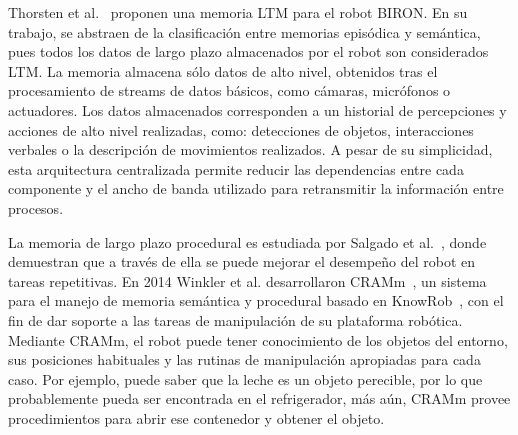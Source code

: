 Thorsten et al.~\cite{Spexard2008} proponen una memoria LTM para el robot BIRON. En su trabajo, se abstraen de la clasificación entre memorias episódica y semántica, pues todos los datos de largo plazo almacenados por el robot son considerados LTM. La memoria almacena sólo datos de alto nivel, obtenidos tras el procesamiento de streams de datos básicos, como cámaras, micrófonos o actuadores. Los datos almacenados corresponden a un historial de percepciones y acciones de alto nivel realizadas, como: detecciones de objetos, interacciones verbales o la descripción de movimientos realizados. A pesar de su simplicidad, esta arquitectura centralizada permite reducir las dependencias entre cada componente y el ancho de banda utilizado para retransmitir la información entre procesos.

La memoria de largo plazo procedural es estudiada por Salgado et al.~\cite{Salgado2012}, donde demuestran que a través de ella se puede mejorar el desempeño del robot en tareas repetitivas. En 2014 Winkler et al. desarrollaron CRAMm~\cite{Winkler2014}, un sistema para el manejo de memoria semántica y procedural basado en KnowRob~\cite{Tenorth2013}, con el fin de dar soporte a las tareas de manipulación de su plataforma robótica. Mediante CRAMm, el robot puede tener conocimiento de los objetos del entorno, sus posiciones habituales y las rutinas de manipulación apropiadas para cada caso. Por ejemplo, puede saber que la leche es un objeto perecible, por lo que probablemente pueda ser encontrada en el refrigerador, más aún, CRAMm provee procedimientos para abrir ese contenedor y obtener el objeto.









